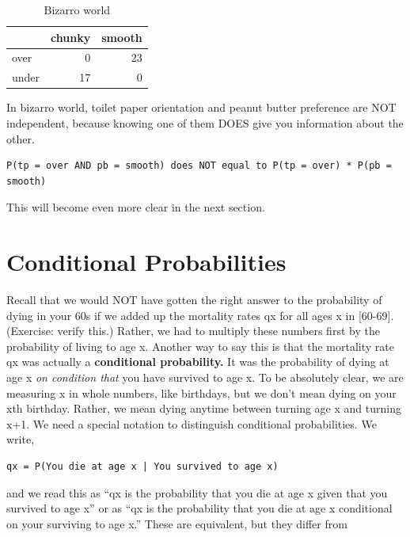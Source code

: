 \documentclass[
  openany]{book}
\begin{document}
\begin{table}[!h]

\caption{\label{tab:tpxpb-reprise}Bizarro world}
\centering
\begin{tabular}[t]{lrr}
\toprule
  & chunky & smooth\\
\midrule
over & 0 & 23\\
under & 17 & 0\\
\bottomrule
\end{tabular}
\end{table}

In bizarro world, toilet paper orientation and peanut butter preference are NOT independent, because knowing one of them DOES give you information about the other.

\begin{verbatim}
P(tp = over AND pb = smooth) does NOT equal to P(tp = over) * P(pb = smooth)
\end{verbatim}

This will become even more clear in the next section.

\hypertarget{conditional-probabilities}{%
\section*{Conditional Probabilities}\label{conditional-probabilities}}

Recall that we would NOT have gotten the right answer to the probability of dying in your 60s if we added up the mortality rates qx for all ages x in {[}60-69{]}. (Exercise: verify this.) Rather, we had to multiply these numbers first by the probability of living to age x. Another way to say this is that the mortality rate qx was actually a \textbf{conditional probability.} It was the probability of dying at age x \emph{on condition that} you have survived to age x. To be absolutely clear, we are measuring x in whole numbers, like birthdays, but we don't mean dying on your xth birthday. Rather, we mean dying anytime between turning age x and turning x+1. We need a special notation to distinguish conditional probabilities. We write,

\begin{verbatim}
qx = P(You die at age x | You survived to age x)
\end{verbatim}

and we read this as ``qx is the probability that you die at age x given that you survived to age x'' or as ``qx is the probability that you die at age x conditional on your surviving to age x.'' These are equivalent, but they differ from
\end{document}
